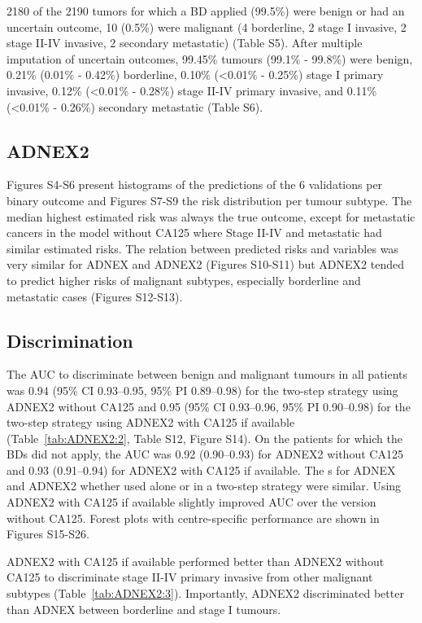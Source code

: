 2180 of the 2190 tumors for which a BD applied (99.5\%) were benign or had an uncertain outcome, 10 (0.5\%) were malignant (4 borderline, 2 stage I invasive, 2 stage II-IV invasive, 2 secondary metastatic) (Table S5). After multiple imputation of uncertain outcomes, 99.45\% tumours (99.1\% - 99.8\%) were benign, 0.21\% (0.01\% - 0.42\%) borderline, 0.10\% (<0.01\% - 0.25\%) stage I primary invasive, 0.12\% (<0.01\% - 0.28\%) stage II-IV primary invasive, and 0.11\% (<0.01\% - 0.26\%) secondary metastatic (Table S6). 

\subsection{ADNEX2}

Figures S4-S6 present histograms of the predictions of the 6 validations per binary outcome and Figures S7-S9 the risk distribution per tumour subtype. The median highest estimated risk was always the true outcome, except for metastatic cancers in the model without CA125 where Stage II-IV and metastatic had similar estimated risks. The relation between predicted risks and variables was very similar for ADNEX and ADNEX2 (Figures S10-S11) but ADNEX2 tended to predict higher risks of malignant subtypes, especially borderline and metastatic cases (Figures S12-S13).  

\subsection{Discrimination}

The \gls{AUC} to discriminate between benign and malignant tumours in all patients was 0.94 (95\% \gls{CI} 0.93--0.95, 95\% \gls{PI} 0.89--0.98) for the two-step strategy using ADNEX2 without \gls{CA125} and 0.95 (95\% \gls{CI} 0.93--0.96, 95\% \gls{PI} 0.90--0.98) for the two-step strategy using ADNEX2 with \gls{CA125} if available (Table~\ref{tab:ADNEX2:2}, Table S12, Figure S14). On the patients for which the \glspl{BD} did not apply, the \gls{AUC} was 0.92 (0.90--0.93) for ADNEX2 without \gls{CA125} and 0.93 (0.91--0.94) for ADNEX2 with \gls{CA125} if available. The s for \gls{ADNEX} and ADNEX2 whether used alone or in a two-step strategy were similar. Using ADNEX2 with \gls{CA125} if available slightly improved \gls{AUC} over the version without \gls{CA125}. Forest plots with centre-specific performance are shown in Figures S15-S26. 

ADNEX2 with \gls{CA125} if available performed better than ADNEX2 without \gls{CA125} to discriminate stage II-IV primary invasive from other malignant subtypes (Table~\ref{tab:ADNEX2:3}). Importantly, ADNEX2 discriminated better than \gls{ADNEX} between borderline and stage I tumours.

